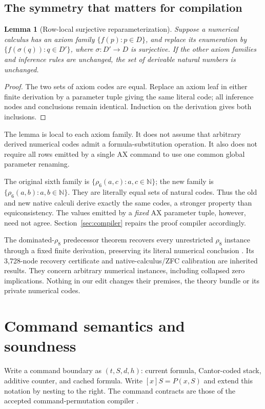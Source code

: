 \documentclass[11pt,a4paper]{article}
\newtheorem{lemma}[theorem]{Lemma}
\theoremstyle{remark}\newtheorem{remark}[theorem]{Remark}
\newcommand{\Nat}{\mathbb N}
\begin{document}
\subsection{The symmetry that matters for compilation}

\begin{lemma}[Row-local surjective reparameterization]\label{lem:family}
Suppose a numerical calculus has an axiom family
$\{f(p):p\in D\}$, and replace its enumeration by
$\{f(\sigma(q)):q\in D'\}$, where $\sigma:D'\to D$ is surjective.
If the other axiom families and inference rules are unchanged, the
set of derivable natural numbers is unchanged.
\end{lemma}
\begin{proof}
The two sets of axiom codes are equal. Replace an axiom leaf in either
finite derivation by a parameter tuple giving the same literal code;
all inference nodes and conclusions remain identical. Induction on the
derivation gives both inclusions.
\end{proof}

The lemma is local to each axiom family. It does not assume that arbitrary
derived numerical codes admit a formula-substitution operation.
It also does not require all rows emitted by a single AX command to use
one common global parameter renaming.

The original sixth family is
$\{\rho_6(a,c):a,c\in\Nat\}$; the new family is
$\{\rho_6(a,b):a,b\in\Nat\}$.
They are literally equal sets of natural codes. Thus the old and new
native calculi derive exactly the same codes, a stronger property than
equiconsistency. The values emitted by a \emph{fixed} AX parameter tuple,
however, need not agree. Section~\ref{sec:compiler} repairs the proof
compiler accordingly.

The dominated-$\rho_8$ predecessor theorem recovers every unrestricted
$\rho_8$ instance through a fixed finite derivation, preserving its
literal numerical conclusion \cite{dominated}. Its 3,728-node recovery
certificate and native-calculus/ZFC calibration are inherited results.
They concern arbitrary numerical instances, including collapsed zero
implications. Nothing in our edit changes their premises, the theory
bundle or its private numerical codes.

\section{Command semantics and soundness}

Write a command boundary as $(t,S,d,h)$: current formula, Cantor-coded
stack, additive counter, and cached formula. Write $[x]S=P(x,S)$ and
extend this notation by nesting to the right. The command contracts are
those of the accepted command-permutation compiler \cite{commands}.
\end{document}
